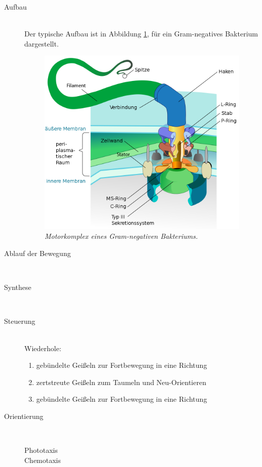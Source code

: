 \begin{description}
	\item[Aufbau] \hfill \\
		Der typische Aufbau ist in Abbildung \ref{fig:flagellum},
		für ein Gram-negatives Bakterium dargestellt.

		\begin{figure}[ht!]
			\leavevmode
			\begin{center}
				\includegraphics[scale=0.3]{./pictures/flagellum_1k}
			\end{center}
			\caption{\slshape{Motorkomplex eines Gram-negativen Bakteriums.}}
			\label{fig:flagellum}
		\end{figure}

	\item[Ablauf der Bewegung] \hfill \\

	\item[Synthese] \hfill \\

	\item[Steuerung] \hfill \\
		Wiederhole:
		\begin{enumerate}
			\item gebündelte Geißeln zur Fortbewegung in eine Richtung
			\item zertstreute Geißeln zum Taumeln und Neu-Orientieren
			\item gebündelte Geißeln zur Fortbewegung in eine Richtung
		\end{enumerate}

	\item[Orientierung] \hfill \\
		\begin{description}
			\item[Phototaxis]
			\item[Chemotaxis]
		\end{description}

\end{description}

